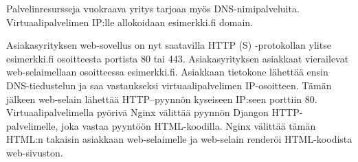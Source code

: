     Palvelinresursseja vuokraava yritys tarjoaa myös DNS-nimipalveluita. Virtuaalipalvelimen IP:lle allokoidaan esimerkki.fi domain.

    Asiakasyrityksen web-sovellus on nyt saatavilla HTTP (S) -protokollan ylitse esimerkki.fi osoitteesta portista 80 tai 443. Asiakasyrityksen asiakkaat vierailevat web-selaimellaan osoitteessa esimerkki.fi. Asiakkaan tietokone lähettää ensin DNS-tiedustelun ja saa vastaukseksi virtuaalipalvelimen IP-osoitteen. Tämän jälkeen web-selain lähettää HTTP–pyynnön kyseiseen IP:seen porttiin 80. Virtuaalipalvelimella pyörivä Nginx välittää pyynnön Djangon HTTP-palvelimelle, joka vastaa pyyntöön HTML-koodilla. Nginx välittää tämän HTML:n takaisin asiakkaan web-selaimelle ja web-selain renderöi HTML-koodista web-sivuston.
